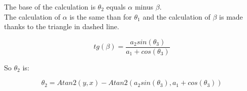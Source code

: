 The base of the calculation is $\theta_2$ equals $\alpha$ minus $\beta$.\\
The calculation of $\alpha$ is the same than for $\theta_1$ and the calculation of $\beta$ is made thanks to the triangle in dashed line.\\

\begin{center}
	\begin{equation}
		tg(\beta) = \frac{a_2sin(\theta_3)}{a_1+cos(\theta_3)}
	\end{equation}
\end{center}

So $\theta_2$ is:\\

\begin{center}
	\begin{equation}
		\theta_2 = Atan2(y,x) - Atan2(a_2sin(\theta_3),a_1+cos(\theta_3))
	\end{equation}
\end{center}